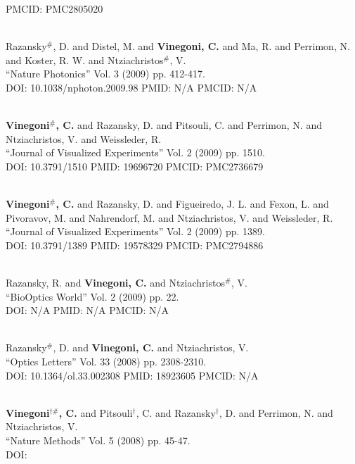 PMCID: PMC2805020\item {} \\ Razansky$^\#$, D. and Distel, M. and {\bf Vinegoni, C.} and Ma, R. and Perrimon, N. and Koster, R. W. and Ntziachristos$^\#$, V. \\ ``Nature Photonics'' Vol. 3 (2009) pp. 412-417. \\ DOI: 10.1038/nphoton.2009.98 PMID: N/A PMCID: N/A\item {} \\ {\bf Vinegoni$^\#$, C.} and Razansky, D. and Pitsouli, C. and Perrimon, N. and Ntziachristos, V. and Weissleder, R. \\ ``Journal of Visualized Experiments'' Vol. 2 (2009) pp. 1510. \\ DOI: 10.3791/1510 PMID: 19696720 PMCID: PMC2736679\item {} \\ {\bf Vinegoni$^\#$, C.} and Razansky, D. and Figueiredo, J. L. and Fexon, L. and Pivoravov, M. and Nahrendorf, M. and Ntziachristos, V. and Weissleder, R. \\ ``Journal of Visualized Experiments'' Vol. 2 (2009) pp. 1389. \\ DOI: 10.3791/1389 PMID: 19578329 PMCID: PMC2794886\item {} \\ Razansky, R. and {\bf Vinegoni, C.} and Ntziachristos$^\#$, V. \\ ``BioOptics World'' Vol. 2 (2009) pp. 22. \\ DOI: N/A PMID: N/A PMCID: N/A\item {} \\ Razansky$^\#$, D. and {\bf Vinegoni, C.} and Ntziachristos, V. \\ ``Optics Letters'' Vol. 33 (2008) pp. 2308-2310. \\ DOI: 10.1364/ol.33.002308 PMID: 18923605 PMCID: N/A\item {} \\ {\bf Vinegoni$^{\dag \#}$, C.} and Pitsouli$^\dag$, C. and Razansky$^\dag$, D. and Perrimon, N. and Ntziachristos, V. \\ ``Nature Methods'' Vol. 5 (2008) pp. 45-47. \\ DOI: 